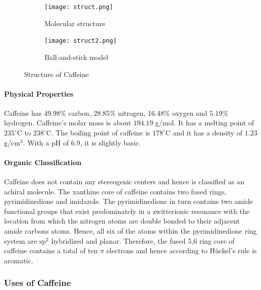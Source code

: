 \documentclass[11pt]{article}
\begin{document}

\begin{figure}[h]
\centering
\begin{subfigure}{.4\textwidth}
  \centering
  \texttt{[image: struct.png]}
  \caption{Molecular structure\cite{sfig1}}
  \label{struct1}
\end{subfigure}
\hspace{.14\textwidth}
\begin{subfigure}{.4\textwidth}
  \centering
  \texttt{[image: struct2.png]}
  \caption{Ball-and-stick model\cite{sfig2}}
  \label{struct2}
\end{subfigure}
\caption{Structure of Caffeine}
\label{struct}
\end{figure}

\paragraph{Physical Properties}
Caffeine has 49.98\% carbon, 28.85\% nitrogen, 16.48\% oxygen and  5.19\% hydrogen. Caffeine’s molar
mass is about $194.19$ g/mol. It has a melting point of $\mathrm{235^{\circ}C}$ to
$\mathrm{238^{\circ}C}$. The boiling point of caffeine is $\mathrm{178^{\circ}C}$ and it has a
density of $1.23$ $\mathrm{g/cm^3}$. With a pH of 6.9, it is slightly basic.

\paragraph{Organic Classification}
Caffeine does not contain any stereogenic centers and hence is classified as an achiral
molecule. The xanthine core of caffeine contains two fused rings, pyrimidinedione\cite{chem1} and
imidazole.\cite{chem2} The pyrimidinedione in turn contains two amide functional groups that exist
predominately in a zwitterionic\cite{chem3} resonance with the location from which the nitrogen atoms are double
bonded to their adjacent amide carbons atoms. Hence, all six of the atoms within the pyrimidinedione
ring system are $\mathrm{sp^2}$ hybridized and planar. Therefore, the fused 5,6 ring core of
caffeine contains a total of ten $\pi$ electrons and hence according to Hückel's rule is aromatic.

\subsubsection{Uses of Caffeine}
\end{document}
